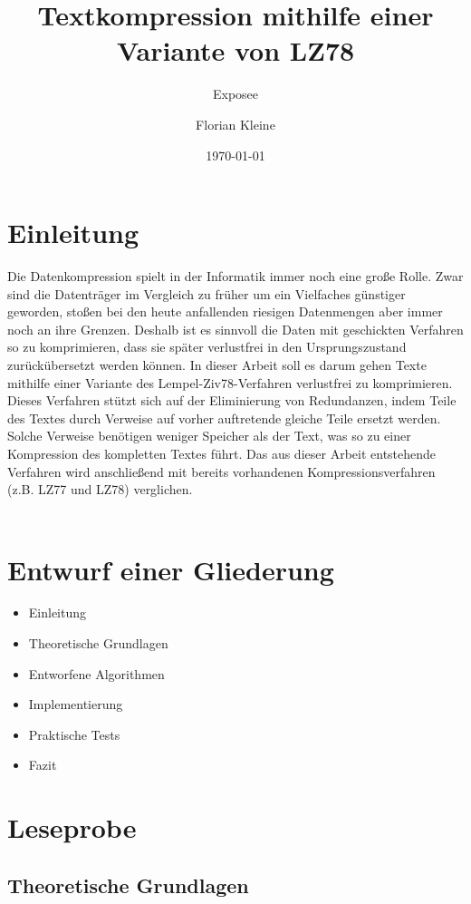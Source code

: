 \documentclass[a4paper,11pt]{scrartcl}%
\title{\vspace{3cm}Textkompression mithilfe einer Variante von LZ78}
\subtitle{Exposee}
\author{Florian Kleine}
\date{\today}
\theoremstyle{change}
\theoremstyle{nonumberplain}
\theoremstyle{change}
\theoremstyle{nonumberplain}
\theoremstyle{change}
\theoremstyle{nonumberplain}
\begin{document}
\maketitle
\newpage
\tableofcontents
\newpage
\newpage
\section{Einleitung}

Die Datenkompression spielt in der Informatik immer noch eine große Rolle. Zwar sind die Datenträger im Vergleich zu früher um ein Vielfaches günstiger geworden, stoßen bei den heute anfallenden riesigen Datenmengen aber immer noch an ihre Grenzen. Deshalb ist es sinnvoll die Daten mit geschickten Verfahren so zu komprimieren, dass sie später verlustfrei in den Ursprungszustand zurückübersetzt werden können.
In dieser Arbeit soll es darum gehen Texte mithilfe einer Variante des Lempel-Ziv78-Verfahren verlustfrei zu komprimieren. Dieses Verfahren stützt sich auf der Eliminierung von Redundanzen, indem Teile des Textes durch Verweise auf vorher auftretende gleiche Teile ersetzt werden. Solche Verweise benötigen weniger Speicher als der Text, was so zu einer Kompression des kompletten Textes führt.
Das aus dieser Arbeit entstehende Verfahren wird anschließend mit bereits vorhandenen Kompressionsverfahren (z.B. LZ77 und LZ78) verglichen.\\\\

\section{Entwurf einer Gliederung}

	\begin{itemize}
		\item Einleitung
		\item Theoretische Grundlagen
		\item Entworfene Algorithmen
		\item Implementierung
		\item Praktische Tests
		\item Fazit
	\end{itemize}
\newpage	
\section{Leseprobe}
	\subsection{Theoretische Grundlagen}
	
\end{document}
